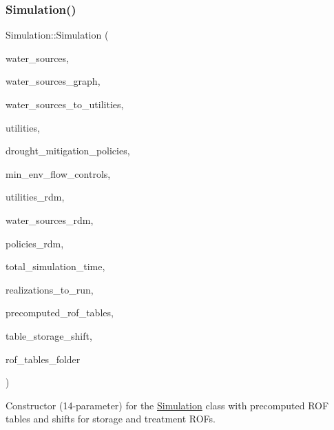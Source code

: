 \subsubsection{\texorpdfstring{Simulation()}{Simulation()}\hspace{0.1cm}{\footnotesize\ttfamily [2/4]}}
{\footnotesize\ttfamily Simulation\+::\+Simulation (\begin{DoxyParamCaption}\item[{vector$<$ \mbox{\hyperlink{classWaterSource}{Water\+Source}} $\ast$$>$ \&}]{water\+\_\+sources,  }\item[{\mbox{\hyperlink{classGraph}{Graph}} \&}]{water\+\_\+sources\+\_\+graph,  }\item[{const vector$<$ vector$<$ int $>$$>$ \&}]{water\+\_\+sources\+\_\+to\+\_\+utilities,  }\item[{vector$<$ \mbox{\hyperlink{classUtility}{Utility}} $\ast$$>$ \&}]{utilities,  }\item[{const vector$<$ \mbox{\hyperlink{classDroughtMitigationPolicy}{Drought\+Mitigation\+Policy}} $\ast$$>$ \&}]{drought\+\_\+mitigation\+\_\+policies,  }\item[{vector$<$ \mbox{\hyperlink{classMinEnvFlowControl}{Min\+Env\+Flow\+Control}} $\ast$$>$ \&}]{min\+\_\+env\+\_\+flow\+\_\+controls,  }\item[{vector$<$ vector$<$ double $>$$>$ \&}]{utilities\+\_\+rdm,  }\item[{vector$<$ vector$<$ double $>$$>$ \&}]{water\+\_\+sources\+\_\+rdm,  }\item[{vector$<$ vector$<$ double $>$$>$ \&}]{policies\+\_\+rdm,  }\item[{const unsigned long}]{total\+\_\+simulation\+\_\+time,  }\item[{vector$<$ unsigned long $>$ \&}]{realizations\+\_\+to\+\_\+run,  }\item[{vector$<$ vector$<$ \mbox{\hyperlink{classMatrix2D}{Matrix2D}}$<$ double $>$$>$$>$ \&}]{precomputed\+\_\+rof\+\_\+tables,  }\item[{vector$<$ vector$<$ double $>$$>$ \&}]{table\+\_\+storage\+\_\+shift,  }\item[{string \&}]{rof\+\_\+tables\+\_\+folder }\end{DoxyParamCaption})}



Constructor (14-\/parameter) for the \mbox{\hyperlink{classSimulation}{Simulation}} class with precomputed R\+OF tables and shifts for storage and treatment R\+O\+Fs. 

